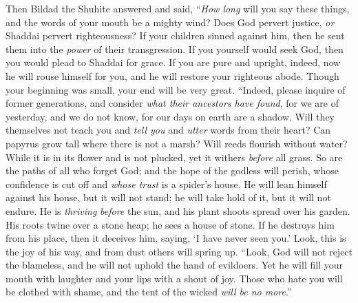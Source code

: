 \begin{biblechapter} %
 Then Bildad the Shuhite answered and said,
\verse “\textit{How long} will you say these things, 
and the words of your mouth be a mighty wind?
\verse Does God pervert justice, 
\textit{or} Shaddai pervert righteousness?
\verse If your children sinned against him, 
then he sent them into the \textit{power} of their transgression.
\verse If you yourself would seek God, 
then you would plead to Shaddai for grace.
\verse If you are pure and upright, 
indeed, now he will rouse himself for you, 
and he will restore your righteous abode.
\verse Though your beginning was small, 
your end will be very great.
\verse “Indeed, please inquire of former generations, 
and consider \textit{what their ancestors have found},
\verse for we are of yesterday, and we do not know, 
for our days on earth are a shadow.
\verse Will they themselves not teach you and \textit{tell you} 
and \textit{utter} words from their heart?
\verse Can papyrus grow tall where there is not a marsh? 
Will reeds flourish without water?
\verse While it is in its flower and is not plucked, 
yet it withers \textit{before} all grass.
\verse So are the paths of all who forget God; 
and the hope of the godless will perish,
\verse whose confidence is cut off 
and \textit{whose trust} is a spider’s house.
\verse He will lean himself against his house, but it will not stand; 
he will take hold of it, but it will not endure.
\verse He is \textit{thriving} \textit{before} the sun, 
and his plant shoots spread over his garden.
\verse His roots twine over a stone heap; 
he sees a house of stone.
\verse If he destroys him from his place, 
then it deceives him, saying, ‘I have never seen you.’
\verse Look, this is the joy of his way, 
and from dust others will spring up.
\verse “Look, God will not reject the blameless, 
and he will not uphold the hand of evildoers.
\verse Yet he will fill your mouth with laughter 
and your lips with a shout of joy.
\verse Those who hate you will be clothed with shame, 
and the tent of the wicked \textit{will be no more}.”
\end{biblechapter}

